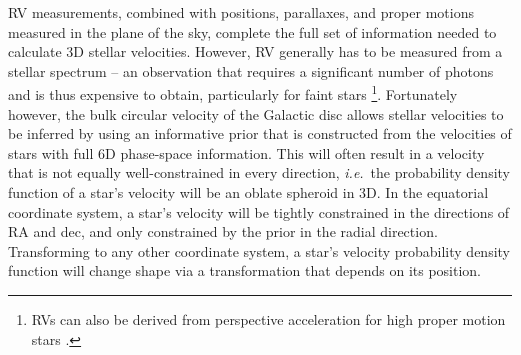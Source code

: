 \documentclass[]{aastex631}
\newcommand{\ie}{{\it i.e.}}
\newcommand{\eg}{{\it e.g.}}
\newcommand{\vz}{$v_{\bf z}$}
\begin{document}
RV measurements, combined with positions, parallaxes, and proper motions
measured in the plane of the sky, complete the full set of information needed
to calculate 3D stellar velocities.
However, RV generally has to be measured from a stellar spectrum -- an
observation that requires a significant number of photons and is thus
expensive to obtain, particularly for faint stars \footnote{RVs can also be
derived from perspective acceleration for high proper motion stars
\citep[\eg][]{lindegren2021}.}.
Fortunately however, the bulk circular velocity of the Galactic disc allows
stellar velocities to be inferred by using an informative prior that is
constructed from the velocities of stars with full 6D phase-space information.
This will often result in a velocity that is not equally well-constrained in
every direction, \ie\ the probability density function of a star's velocity
will be an oblate spheroid in 3D.
In the equatorial coordinate system, a star's velocity will be tightly
constrained in the directions of RA and dec, and only constrained by
the prior in the radial direction.
Transforming to any other coordinate system, a star's velocity probability
density function will change shape via a transformation that depends on its
position.

\end{document}
